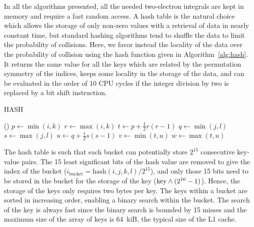 \documentclass[./thesis.tex]{subfiles}
\begin{document}
In all the algorithms presented, all the needed two-electron integrals are kept in memory
and require a fast random access.
A hash table is the natural choice which allows the storage of only non-zero
values with a retrieval of data in nearly constant time, but standard hashing
algorithms tend to shuffle the data to limit the probability of collisions.
Here, we favor instead the locality of the data over the probability of collision
using the hash function given in Algorithm~\ref{alg:hash}.  It returns the same
value for all the keys which are related by the permutation symmetry of the
indices, keeps some locality in the storage of the data, and can be evaluated
in the order of 10 CPU cycles if the integer division by two is replaced by a
bit shift instruction.

\begin{algorithm}
 \caption{HASH}
 \label{alg:hash}
\Fn(){}{
        $p \gets \min (i,k)$ \;
        $r \gets \max (i,k)$ \;
        $t \gets p + \frac{1}{2} r (r-1)$ \;
        $q \gets \min (j,l)$ \;
        $s \gets \max (j,l)$ \;
        $u \gets q + \frac{1}{2} s (s-1)$ \;
        $v \gets \min (t,u)$ \;
        $w \gets \max (t,u)$ \;
         \;
}
\end{algorithm}

The hash table is such that each bucket can potentially store $2^{15}$
consecutive key-value pairs. The 15 least significant bits of the hash value
are removed to give the index of the bucket ($i_\text{bucket} =
\text{hash}(i,j,k,l)/2^{15}$), and only those 15 bits need to be
stored in the bucket for the storage of the key ($\text{key} \wedge (2^{16}-1)$).
Hence, the storage of the keys only requires two bytes per key.
The keys within a bucket are sorted in increasing order, enabling a binary
search within the bucket. The search of the key is always fast
since the binary search is bounded by 15 misses and the maximum size of the
array of keys is 64~kiB, the typical size of the L1 cache.
\end{document}
